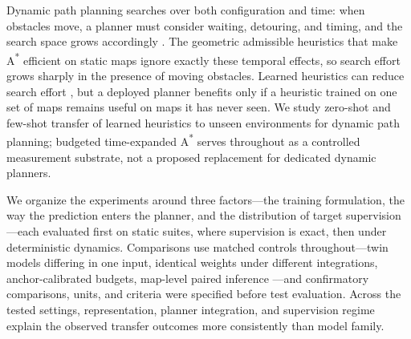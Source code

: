 \documentclass[letterpaper]{article} %
\begin{document}
Dynamic path planning searches over both configuration and time: when obstacles move, a planner must consider waiting, detouring, and timing, and the search space grows accordingly \citep{silver2005cooperative,phillips2011sipp}. The geometric admissible heuristics that make A\textsuperscript{*} \citep{hart1968astar} efficient on static maps ignore exactly these temporal effects, so search effort grows sharply in the presence of moving obstacles. Learned heuristics can reduce search effort \citep{arfaee2011bootstrap,bhardwaj2017sail,yonetani2021neuralastar}, but a deployed planner benefits only if a heuristic trained on one set of maps remains useful on maps it has never seen. We study zero-shot and few-shot transfer of learned heuristics to unseen environments for dynamic path planning; budgeted time-expanded A\textsuperscript{*} serves throughout as a controlled measurement substrate, not a proposed replacement for dedicated dynamic planners.

We organize the experiments around three factors---the training formulation, the way the prediction enters the planner, and the distribution of target supervision---each evaluated first on static suites, where supervision is exact, then under deterministic dynamics. Comparisons use matched controls throughout---twin models differing in one input, identical weights under different integrations, anchor-calibrated budgets, map-level paired inference \citep{henderson2018matters,agarwal2021precipice,pineau2021reproducibility}---and confirmatory comparisons, units, and criteria were specified before test evaluation. Across the tested settings, representation, planner integration, and supervision regime explain the observed transfer outcomes more consistently than model family.
\end{document}
